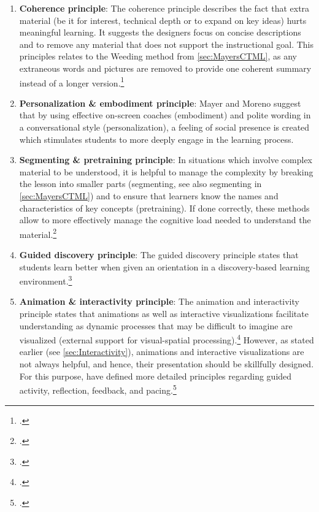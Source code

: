 \begin{enumerate}
    \item \textbf{Coherence principle}: The coherence principle describes the fact that extra material (be it for interest, technical depth or to expand on key ideas) hurts meaningful learning. It suggests the designers focus on concise descriptions and to remove any material that does not support the instructional goal. This principles relates to the Weeding method from \ref{sec:MayersCTML}, as any extraneous words and pictures are removed to provide one coherent summary instead of a longer version.\footcites[Cf.][chapter 8, paragraphs 1 et seq]{ClarkElearningscienceinstruction2016}[cf.][p.6]{MayerMultimediaLearning2009}[cf.][p.22]{MayerAnimationAidMultimedia2001}
    \item \textbf{Personalization \& embodiment principle}: Mayer and Moreno suggest that by using effective on-screen coaches (embodiment) and polite wording in a conversational style (personalization), a feeling of social presence is created which stimulates students to more deeply engage in the learning process. 
    \item \textbf{Segmenting \& pretraining principle}: In situations which involve complex material to be understood, it is helpful to manage the complexity by breaking the lesson into smaller parts (segmenting, see also segmenting in \ref{sec:MayersCTML}) and to ensure that learners know the names and characteristics of key concepts (pretraining). If done correctly, these methods allow to more effectively manage the cognitive load needed to understand the material.\footcites[Cf.][chapters 9 and 10]{ClarkElearningscienceinstruction2016}
    \item \textbf{Guided discovery principle}: The guided discovery principle states that students learn better when given an orientation in a discovery-based learning environment.\footcites[Cf.][p.7]{MayerMultimediaLearning2009}
    \item \textbf{Animation \& interactivity principle}: The animation and interactivity principle states that animations as well as interactive visualizations facilitate understanding as dynamic processes that may be difficult to imagine are visualized (external support for visual-spatial processing).\footcites[Cf.][p.290]{Betrancourtanimationinteractivityprinciples2005}[cf.][p.81]{MunzerLearningmultimediapresentations2009}[cf.][p.19]{LeeScreenDesignGuidelines1999}[cf.][p.814]{MayerNineWaysReduce2003} However, as stated earlier (see \ref{sec:Interactivity}), animations and interactive visualizations are not always helpful, and hence, their presentation should be skillfully designed. For this purpose, \cite{MorenoInteractiveMultimodalLearning2007} have defined more detailed principles regarding guided activity, reflection, feedback, and pacing.\footcites[Cf.][p.292]{PatwardhanWhendoeshigher2015}[cf.][p.7]{MayerMultimediaLearning2009}[cf.][p.316]{MorenoInteractiveMultimodalLearning2007} %

\end{enumerate}
